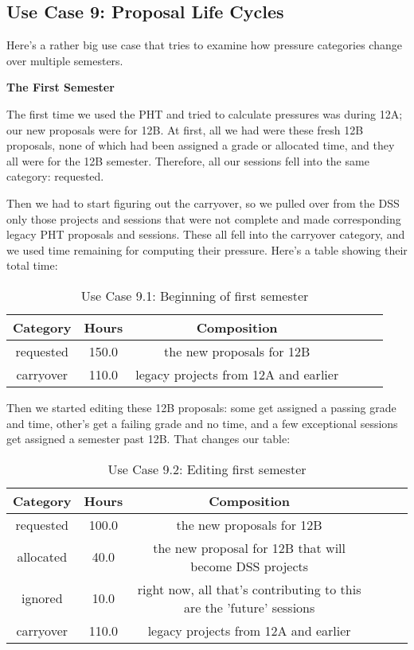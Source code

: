 \documentclass{article}
\begin{document}
\subsection{Use Case 9: Proposal Life Cycles}

Here's a rather big use case that tries to examine how pressure categories change over multiple semesters.

{\bf The First Semester}

The first time we used the PHT and tried to calculate pressures was during 12A; our new proposals were for 12B. At first, all we had were these fresh 12B proposals, none of which had been assigned a grade or allocated time, and they all were for the 12B semester. Therefore, all our sessions fell into the same category: requested.

Then we had to start figuring out the carryover, so we pulled over from the DSS only those projects and sessions that were not complete and made corresponding legacy PHT proposals and sessions. These all fell into the carryover category, and we used time remaining for computing their pressure. Here's a table showing their total time:

\begin{table}
{\footnotesize
\caption{Use Case 9.1: Beginning of first semester\label{tab:time}}
\begin{tabular*}{1.05\textwidth}{@{\extracolsep{\fill}}cccccc}
\hline \hline
{\bf Category} & {\bf Hours} & {\bf Composition}\\
\hline
requested & 150.0 & the new proposals for 12B\\
carryover & 110.0 & legacy projects from 12A and earlier\\
\hline \hline
\end{tabular*}
}
\end{table}

Then we started editing these 12B proposals: some get assigned a passing grade and time, other's get a failing grade and no time, and a few exceptional sessions get assigned a semester past 12B. That changes our table:

\begin{table}
{\footnotesize
\caption{Use Case 9.2: Editing first semester\label{tab:time}}
\begin{tabular*}{1.05\textwidth}{@{\extracolsep{\fill}}cccccc}
\hline \hline
{\bf Category} & {\bf Hours} & {\bf Composition}\\
\hline
requested & 100.0 & the new proposals for 12B\\
allocated & 40.0 & the new proposal for 12B that will become DSS projects\\
ignored & 10.0 & right now, all that's contributing to this are the 'future' sessions\\
carryover & 110.0 & legacy projects from 12A and earlier\\
\hline \hline
\end{tabular*}
}
\end{table}
\end{document}

